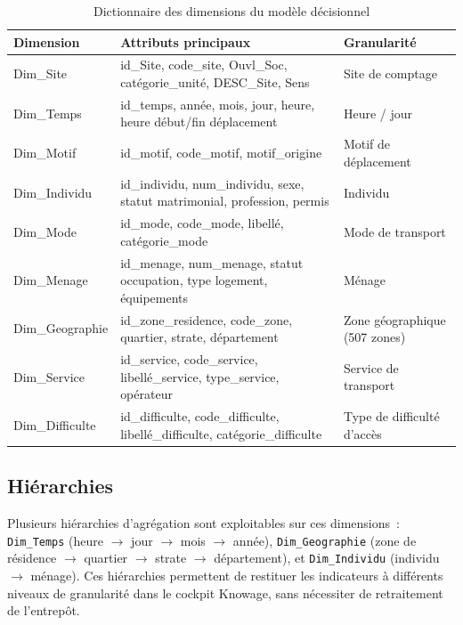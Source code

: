 \begin{table}[H]
\centering
\caption{Dictionnaire des dimensions du modèle décisionnel}
\label{tab:dim_dict}
\begin{tabular}{p{2.6cm}p{6.8cm}p{3.6cm}}
\toprule
\textbf{Dimension} & \textbf{Attributs principaux} & \textbf{Granularité} \\
\midrule
Dim\_Site & id\_Site, code\_site, Ouvl\_Soc, catégorie\_unité, DESC\_Site, Sens & Site de comptage \\
Dim\_Temps & id\_temps, année, mois, jour, heure, heure début/fin déplacement & Heure / jour \\
Dim\_Motif & id\_motif, code\_motif, motif\_origine & Motif de déplacement \\
Dim\_Individu & id\_individu, num\_individu, sexe, statut matrimonial, profession, permis & Individu \\
Dim\_Mode & id\_mode, code\_mode, libellé, catégorie\_mode & Mode de transport \\
Dim\_Menage & id\_menage, num\_menage, statut occupation, type logement, équipements & Ménage \\
Dim\_Geographie & id\_zone\_residence, code\_zone, quartier, strate, département & Zone géographique (507 zones) \\
Dim\_Service & id\_service, code\_service, libell\'e\_service, type\_service, op\'erateur & Service de transport \\
Dim\_Difficulte & id\_difficulte, code\_difficulte, libell\'e\_difficulte, cat\'egorie\_difficulte & Type de difficult\'e d'acc\`es \\
\bottomrule
\end{tabular}
\end{table}

\subsection{Hiérarchies}
Plusieurs hiérarchies d'agrégation sont exploitables sur ces dimensions~: \texttt{Dim\_Temps} (heure $\rightarrow$ jour $\rightarrow$ mois $\rightarrow$ année), \texttt{Dim\_Geographie} (zone de résidence $\rightarrow$ quartier $\rightarrow$ strate $\rightarrow$ département), et \texttt{Dim\_Individu} (individu $\rightarrow$ ménage). Ces hiérarchies permettent de restituer les indicateurs à différents niveaux de granularité dans le cockpit Knowage, sans nécessiter de retraitement de l'entrepôt.

